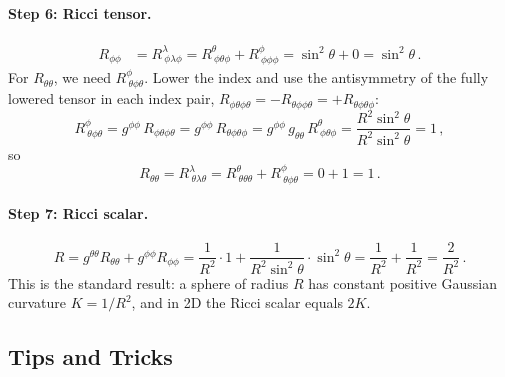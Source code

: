 \paragraph{Step 6: Ricci tensor.}
\begin{align}
    R_{\phi\phi}
    &= R^\lambda_{\ \phi\lambda\phi}
     = R^\theta_{\ \phi\theta\phi} + R^\phi_{\ \phi\phi\phi}
     = \sin^2\theta + 0
     = \sin^2\theta \,.
    \label{eq:cookbook_ricci_phiphi}
\end{align}
For $R_{\theta\theta}$, we need $R^\phi_{\ \theta\phi\theta}$.
Lower the index and use the antisymmetry of the fully lowered tensor
in each index pair,
$R_{\phi\theta\phi\theta} = -R_{\theta\phi\phi\theta} = +R_{\theta\phi\theta\phi}$:
\[
    R^\phi_{\ \theta\phi\theta}
    = g^{\phi\phi}\, R_{\phi\theta\phi\theta}
    = g^{\phi\phi}\, R_{\theta\phi\theta\phi}
    = g^{\phi\phi}\, g_{\theta\theta}\, R^\theta_{\ \phi\theta\phi}
    = \frac{R^2 \sin^2\theta}{R^2 \sin^2\theta} = 1 \,,
\]
so
\begin{equation}
    R_{\theta\theta}
    = R^\lambda_{\ \theta\lambda\theta}
    = R^\theta_{\ \theta\theta\theta} + R^\phi_{\ \theta\phi\theta}
    = 0 + 1 = 1 \,.
    \label{eq:cookbook_ricci_thth}
\end{equation}

\paragraph{Step 7: Ricci scalar.}
\begin{equation}
    R = g^{\theta\theta} R_{\theta\theta} + g^{\phi\phi} R_{\phi\phi}
    = \frac{1}{R^2}\cdot 1 + \frac{1}{R^2\sin^2\theta}\cdot\sin^2\theta
    = \frac{1}{R^2} + \frac{1}{R^2}
    = \boxed{\frac{2}{R^2}} \,.
    \label{eq:cookbook_ricci_scalar_sphere}
\end{equation}
This is the standard result: a sphere of radius $R$ has constant positive
Gaussian curvature $K = 1/R^2$, and in 2D the Ricci scalar equals $2K$.

\subsection{Tips and Tricks}
\label{sec:dg_cookbook_tips}

